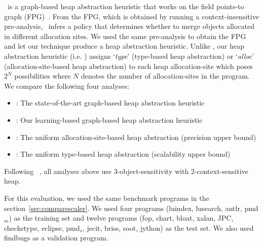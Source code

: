 \Mahjong~is a graph-based heap abstraction heuristic that works on the field points-to graph (FPG)~\cite{Tan2017}.
From the FPG, which is obtained by running a context-insensitive pre-analysis, \Mahjong~infers a policy that determines whether to merge objects allocated in different allocation sites.
We used the same pre-analysis to obtain the FPG and let our technique produce a heap abstraction heuristic.
Unlike \Mahjong, our heap abstraction heuristic (i.e. \OurHeap) assigns `{\it type}' (type-based heap abstraction) or `{\it alloc}' (allocation-site-based heap abstraction) to each heap allocation-site which poses
$2^N$ possibilities where $N$ denotes the number of allocation-sites in the program.
We compare the following four analyses:
\begin{itemize}
\item \Mahjong: The state-of-the-art graph-based heap abstraction heuristic~\cite{Tan2017}
\item \OurHeap: Our learning-based graph-based heap abstraction heuristic
\item \AllocBased: The uniform allocation-site-based heap abstraction (precision upper bound)
\item \TypeBased: The uniform type-based heap abstraction (scalability upper bound)
\end{itemize}
Following \Mahjong~\cite{Tan2017}, all analyses above use 3-object-sensitivity with 2-context-sensitive heap.

For this evaluation, we used the same benchmark programs in the section~\ref{sec:comparescaler}.
We used four programs (luindex, lusearch, antlr, pmd$_{m}$) as the training set and
twelve programs (fop, chart, bloat, xalan, JPC, checkstype, eclipse, pmd$_{s}$, jecit, briss, soot, jython) as the test set.
We also used findbugs as a validation program.








